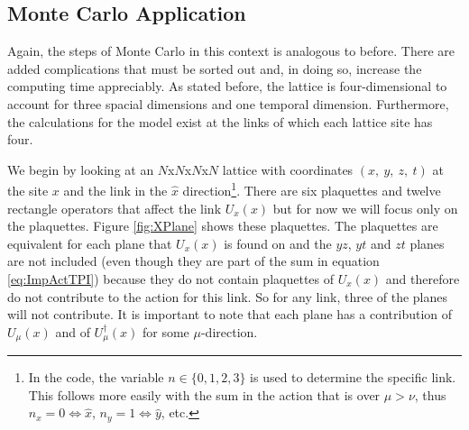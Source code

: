 \documentclass[11pt]{article}
\begin{document}
\subsection{Monte Carlo Application}
Again, the steps of Monte Carlo in this context is analogous to before. There are added complications that must be sorted out and, in doing so, increase the computing time appreciably. As stated before, the lattice is four-dimensional to account for three spacial dimensions and one temporal dimension. Furthermore, the calculations for the model exist at the links of which each lattice site has four.

We begin by looking at an $N$x$N$x$N$x$N$ lattice with coordinates $(x,\ y,\ z,\ t)$ at the site $x$ and the link in the $\hat{x}$ direction\footnote{In the code, the variable $n\in\{0,1,2,3\}$ is used to determine the specific link. This follows more easily with the sum in the action that is over $\mu>\nu$, thus $n_x=0\Leftrightarrow\hat{x}$, $n_y=1\Leftrightarrow\hat{y}$, etc.}. There are six plaquettes and twelve rectangle operators that affect the link $U_x(x)$ but for now we will focus only on the plaquettes. Figure \ref{fig:XPlane} shows these plaquettes. The plaquettes are equivalent for each plane that $U_x(x)$ is found on and the $yz$, $yt$ and $zt$ planes are not included (even though they are part of the sum in equation \ref{eq:ImpActTPI}) because they do not contain plaquettes of $U_x(x)$ and therefore do not contribute to the action for this link. So for any link, three of the planes will not contribute. It is important to note that each plane has a contribution of $U_\mu(x)$ and of $U_\mu^\dagger(x)$ for some $\mu$-direction.
\end{document}

